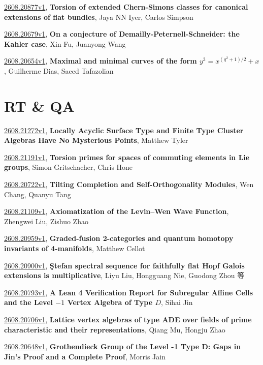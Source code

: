 \documentclass[9pt, a4paper]{article}
\theoremstyle{plain}
\theoremstyle{definition}
\theoremstyle{remark}
\newcommand{\arxiv}[3]{\href{https://arxiv.org/abs/#1}{#1}, \textbf{\textcolor{arxivblue}{#2}}, #3}
\begin{document}
\arxiv{2608.20877v1}{Torsion of extended Chern-Simons classes for canonical extensions of flat bundles}{Jaya NN Iyer, Carlos Simpson}

\arxiv{2608.20679v1}{On a conjecture of Demailly-Peternell-Schneider: the Kahler case}{Xin Fu, Juanyong Wang}

\arxiv{2608.20654v1}{Maximal and minimal curves of the form $y^3=x^{(q^2+1)/2}+x$}{Guilherme Dias, Saeed Tafazolian}


\section{RT \& QA}
\arxiv{2608.21272v1}{Locally Acyclic Surface Type and Finite Type Cluster Algebras Have No Mysterious Points}{Matthew Tyler}

\arxiv{2608.21191v1}{Torsion primes for spaces of commuting elements in Lie groups}{Simon Gritschacher, Chris Hone}

\arxiv{2608.20722v1}{Tilting Completion and Self-Orthogonality Modules}{Wen Chang, Quanyu Tang}

\arxiv{2608.21109v1}{Axiomatization of the Levin--Wen Wave Function}{Zhengwei Liu, Zishuo Zhao}

\arxiv{2608.20959v1}{Graded-fusion 2-categories and quantum homotopy invariants of 4-manifolds}{Matthew Cellot}

\arxiv{2608.20900v1}{Ştefan spectral sequence for faithfully flat Hopf Galois extensions is multiplicative}{Liyu Liu, Hongguang Nie, Guodong Zhou 等}

\arxiv{2608.20793v1}{A Lean 4 Verification Report for Subregular Affine Cells and the Level $-1$ Vertex Algebra of Type $D$}{Sihai Jin}

\arxiv{2608.20706v1}{Lattice vertex algebras of type ADE over fields of prime characteristic and their representations}{Qiang Mu, Hongju Zhao}

\arxiv{2608.20648v1}{Grothendieck Group of the Level -1 Type D: Gaps in Jin's Proof and a Complete Proof}{Morris Jain}

\end{document}
